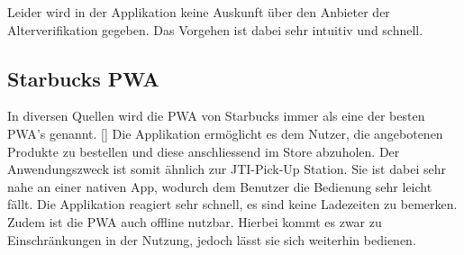 Leider wird in der Applikation keine Auskunft über den Anbieter der Alterverifikation gegeben. Das Vorgehen ist dabei sehr intuitiv und schnell. 

\subsection{Starbucks \ac{PWA}}
In diversen Quellen wird die \ac{PWA} von Starbucks immer als eine der besten \ac{PWA}'s genannt. [\cite{}] Die Applikation ermöglicht es dem Nutzer, die angebotenen Produkte zu bestellen und diese anschliessend im Store abzuholen. Der Anwendungszweck ist somit ähnlich zur JTI-Pick-Up Station. Sie ist dabei sehr nahe an einer nativen App, wodurch dem Benutzer die Bedienung sehr leicht fällt. Die Applikation reagiert sehr schnell, es sind keine Ladezeiten zu bemerken. Zudem ist die \ac{PWA} auch offline nutzbar. Hierbei kommt es zwar zu Einschränkungen in der Nutzung, jedoch lässt sie sich weiterhin bedienen. 
